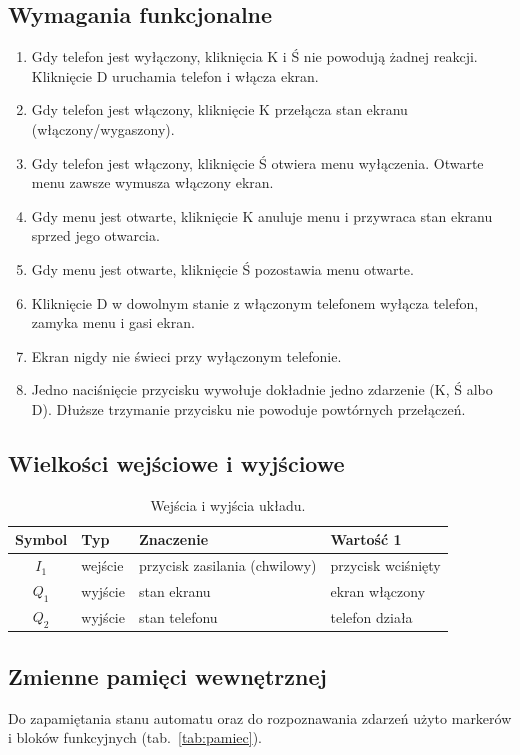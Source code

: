 \subsection{Wymagania funkcjonalne}
\begin{enumerate}
    \item[R1.] Gdy telefon jest wyłączony, kliknięcia K i Ś nie powodują
          żadnej reakcji. Kliknięcie D uruchamia telefon i włącza ekran.
    \item[R2.] Gdy telefon jest włączony, kliknięcie K przełącza stan
          ekranu (włączony/wygaszony).
    \item[R3.] Gdy telefon jest włączony, kliknięcie Ś otwiera menu
          wyłączenia. Otwarte menu zawsze wymusza włączony ekran.
    \item[R4.] Gdy menu jest otwarte, kliknięcie K anuluje menu
          i przywraca stan ekranu sprzed jego otwarcia.
    \item[R5.] Gdy menu jest otwarte, kliknięcie Ś pozostawia menu
          otwarte.
    \item[R6.] Kliknięcie D w dowolnym stanie z włączonym telefonem
          wyłącza telefon, zamyka menu i gasi ekran.
    \item[R7.] Ekran nigdy nie świeci przy wyłączonym telefonie.
    \item[R8.] Jedno naciśnięcie przycisku wywołuje dokładnie jedno
          zdarzenie (K, Ś albo D). Dłuższe trzymanie przycisku nie
          powoduje powtórnych przełączeń.
\end{enumerate}

\subsection{Wielkości wejściowe i wyjściowe}
\begin{table}[H]
\centering
\caption{Wejścia i wyjścia układu.}
\label{tab:io}
\begin{tabular}{clll}
\toprule
Symbol & Typ & Znaczenie & Wartość 1 \\
\midrule
$I_1$ & wejście & przycisk zasilania (chwilowy) & przycisk wciśnięty \\
$Q_1$ & wyjście & stan ekranu & ekran włączony \\
$Q_2$ & wyjście & stan telefonu & telefon działa \\
\bottomrule
\end{tabular}
\end{table}

\subsection{Zmienne pamięci wewnętrznej}
Do zapamiętania stanu automatu oraz do rozpoznawania zdarzeń użyto
markerów i bloków funkcyjnych (tab.~\ref{tab:pamiec}).

